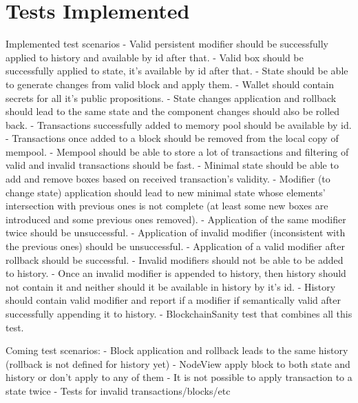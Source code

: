 
\section{Tests Implemented}


Implemented test scenarios
- Valid persistent modifier should be successfully applied to history and available by id after that.
- Valid box should be successfully applied to state, it's available by id after that.
- State should be able to generate changes from valid block and apply them.
- Wallet should contain secrets for all it's public propositions.
- State changes application and rollback should lead to the same state and the component changes should also be rolled back.
- Transactions successfully added to memory pool should be available by id.
- Transactions once added to a block should be removed from the local copy of mempool.
- Mempool should be able to store a lot of transactions and filtering of valid and invalid transactions should be fast.
- Minimal state should be able to add and remove boxes based on received transaction's validity.
- Modifier (to change state) application should lead to new minimal state whose elements' intersection with previous ones is not complete (at least some new boxes are introduced and some previous ones removed).
- Application of the same modifier twice should be unsuccessful.
- Application of invalid modifier (inconsistent with the previous ones) should be unsuccessful.
- Application of a valid modifier after rollback should be successful.
- Invalid modifiers should not be able to be added to history.
- Once an invalid modifier is appended to history, then history should not contain it and neither should it be available in history by it's id.
- History should contain valid modifier and report if a modifier if semantically valid after successfully appending it to history.
- BlockchainSanity test that combines all this test.

Coming test scenarios:
- Block application and rollback leads to the same history (rollback is not defined for history yet)
- NodeView apply block to both state and history or don't apply to any of them
- It is not possible to apply transaction to a state twice
- Tests for invalid transactions/blocks/etc

